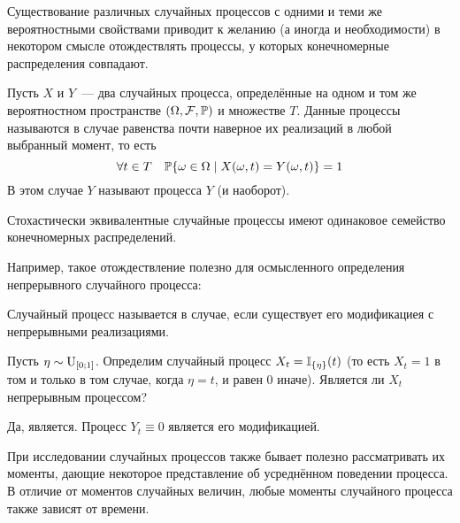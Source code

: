 Существование различных случайных процессов с одними и теми же
вероятностными свойствами приводит к желанию (а иногда и необходимости)
в некотором смысле отождествлять процессы,
у которых конечномерные распределения совпадают.

\begin{definition}
    \label{definition:basics:modification}
    Пусть $ X $ и $ Y $~--- два случайных процесса,
    определённые на одном и том же вероятностном пространстве $ (\Omega, \mathcal{F}, \mathbb{P}) $ и множестве $ T $.
    Данные процессы называются  в случае равенства почти наверное их реализаций в любой выбранный момент,
    то есть
    \[
        \forall t \in T \quad \mathbb{P} \{ \omega \in \Omega \mid X(\omega, t) = Y(\omega, t) \} = 1
    \]
    В этом случае $ Y $ называют  процесса $ Y $ (и наоборот).
\end{definition}

\begin{statement}
    \label{statement:basics:finite_distributions_of_modifications}
    Стохастически эквивалентные случайные процессы имеют одинаковое семейство конечномерных распределений.
\end{statement}

Например, такое отождествление полезно для осмысленного определения непрерывного случайного процесса:
\begin{definition}
    \label{definition:basics:continious_stochastic_process}
    Случайный процесс называется  в случае,
    если существует его модификациея с непрерывными реализациями.
\end{definition}

\begin{Exercise}[counter=SecExercise, label={exercise:basics:continious_stochastic_process}]
    \noindent
    Пусть $ \eta \sim \textnormal{U}_{[0;1]} $.
    Определим случайный процесс $ X_t = \mathbb{I}_{\{\eta\}}(t) $
    (то есть $ X_t = 1 $ в том и только в том случае, когда $ \eta = t $, и равен $ 0 $ иначе).
    Является ли $ X_t $ непрерывным процессом?
\end{Exercise}

\begin{Answer}
    \noindent
    Да, является.
    Процесс $ Y_t \equiv 0 $ является его модификацией.
\end{Answer}


При исследовании случайных процессов также бывает полезно рассматривать их моменты,
дающие некоторое представление об усреднённом поведении процесса.
В отличие от моментов случайных величин, любые моменты случайного процесса также зависят от времени.

